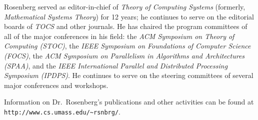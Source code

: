 Rosenberg served as editor-in-chief of {\it Theory of Computing
  Systems} (formerly, {\it Mathematical Systems Theory}) for 12 years;
he continues to serve on the editorial boards of {\it TOCS} and other
journals.  He has chaired the program committees of all of the major
conferences in his field: the {\it ACM Symposium on Theory of
  Computing (STOC)}, the {\it IEEE Symposium on Foundations of
  Computer Science (FOCS)}, the {\it ACM Symposium on Parallelism in
  Algorithms and Architectures (SPAA)}, and the {\it IEEE
  International Parallel and Distributed Processing Symposium (IPDPS)}.
He continues to serve on the steering committees of several major
conferences and workshops.

Information on Dr.~Rosenberg's publications and other activities can
be found at \\
\verb,http://www.cs.umass.edu/~rsnbrg/,.



%
